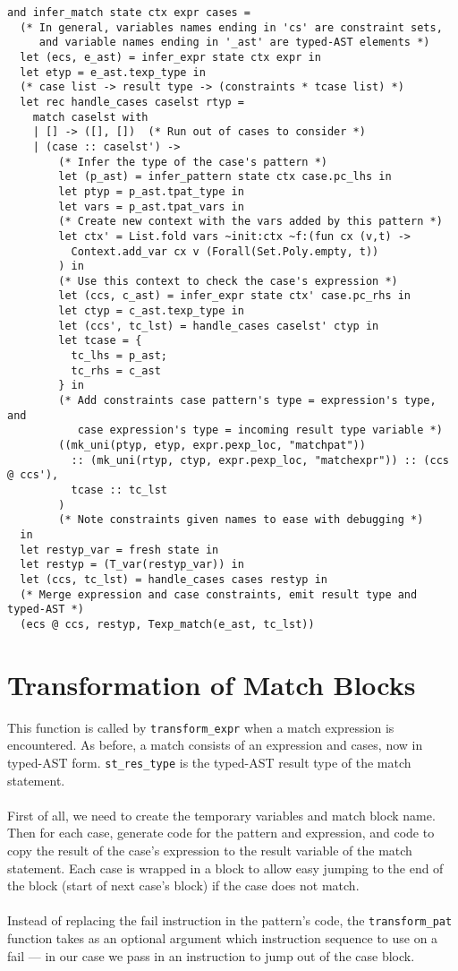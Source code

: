 \documentclass[12pt,notitlepage]{report}
\newcommand{\textinline}{\texttt}
\begin{document}
\begin{verbatim}
and infer_match state ctx expr cases =
  (* In general, variables names ending in 'cs' are constraint sets,
     and variable names ending in '_ast' are typed-AST elements *)
  let (ecs, e_ast) = infer_expr state ctx expr in
  let etyp = e_ast.texp_type in
  (* case list -> result type -> (constraints * tcase list) *)
  let rec handle_cases caselst rtyp =
    match caselst with
    | [] -> ([], [])  (* Run out of cases to consider *)
    | (case :: caselst') ->
        (* Infer the type of the case's pattern *)
        let (p_ast) = infer_pattern state ctx case.pc_lhs in
        let ptyp = p_ast.tpat_type in
        let vars = p_ast.tpat_vars in
        (* Create new context with the vars added by this pattern *)
        let ctx' = List.fold vars ~init:ctx ~f:(fun cx (v,t) ->
          Context.add_var cx v (Forall(Set.Poly.empty, t))
        ) in
        (* Use this context to check the case's expression *)
        let (ccs, c_ast) = infer_expr state ctx' case.pc_rhs in
        let ctyp = c_ast.texp_type in
        let (ccs', tc_lst) = handle_cases caselst' ctyp in
        let tcase = {
          tc_lhs = p_ast;
          tc_rhs = c_ast
        } in
        (* Add constraints case pattern's type = expression's type, and 
           case expression's type = incoming result type variable *)
        ((mk_uni(ptyp, etyp, expr.pexp_loc, "matchpat"))
          :: (mk_uni(rtyp, ctyp, expr.pexp_loc, "matchexpr")) :: (ccs @ ccs'),
          tcase :: tc_lst
        )
        (* Note constraints given names to ease with debugging *)
  in
  let restyp_var = fresh state in
  let restyp = (T_var(restyp_var)) in
  let (ccs, tc_lst) = handle_cases cases restyp in
  (* Merge expression and case constraints, emit result type and typed-AST *)
  (ecs @ ccs, restyp, Texp_match(e_ast, tc_lst))
\end{verbatim}

\section{Transformation of Match Blocks}
\label{sample:transformmatch}
This function is called by \textinline{transform_expr} when a match expression is encountered. As before, a match consists of an expression and cases, now in typed-AST form. \textinline{st_res_type} is the typed-AST result type of the match statement.
\\\\
First of all, we need to create the temporary variables and match block name. Then for each case, generate code for the pattern and expression, and code to copy the result of the case's expression to the result variable of the match statement. Each case is wrapped in a block to allow easy jumping to the end of the block (start of next case's block) if the case does not match.
\\\\
Instead of replacing the fail instruction in the pattern's code, the \textinline{transform_pat} function takes as an optional argument which instruction sequence to use on a fail --- in our case we pass in an instruction to jump out of the case block.
\end{document}
